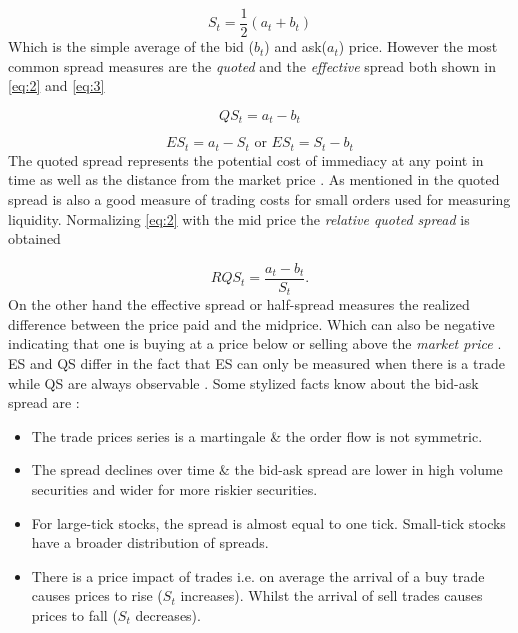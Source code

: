 \documentclass{kththesis}
\theoremstyle{definition}
\begin{document}
\begin{equation}
    \label{eq:1}
    S_{t} = \frac{1}{2}(a_t + b_t)
\end{equation}
Which is the simple average of the bid ($b_t$) and ask($a_t$) price.
However the most common spread measures are the \textit{quoted} and the \textit{effective} \parencite{cartea2015algorithmic, foucault2013market} spread both shown in \autoref{eq:2} and \autoref{eq:3}

\begin{equation}
    \label{eq:2}
    QS_t = a_t - b_t
\end{equation}

\begin{equation}
    \label{eq:3}
    ES_t = a_t - S_t \text{ or } ES_t = S_t - b_t
\end{equation}
The quoted spread represents the potential cost of immediacy at any point in time as well as the distance from the market price \parencite{cartea2015algorithmic}. As mentioned in \textcite{foucault2013market} the quoted spread is also a good measure of trading costs for small orders used for measuring liquidity. Normalizing \autoref{eq:2} with the mid price the \textit{relative quoted spread} is obtained

\begin{equation*}
    RQS_t = \frac{a_t - b_t}{S_t}.
\end{equation*}
On the other hand the effective spread or half-spread measures the realized difference between the price paid and the midprice. Which can also be negative indicating that one is buying at a price below or selling above the \textit{market price} \parencite{cartea2015algorithmic}. ES and QS differ in the fact that ES can only be measured when there is a trade while QS are always observable \parencite{cartea2015algorithmic}. Some stylized facts know about the bid-ask spread are \parencite{hasbrouck2007empirical, madhavan2002market, bouchaud2018trades}:
\begin{itemize}
    \item The trade prices series is a martingale \& the order flow is not symmetric.
    \item The spread declines over time \& the bid-ask spread are lower in high volume securities and wider for more riskier securities.
    \item For large-tick stocks, the spread is almost equal to one tick. Small-tick stocks have a broader distribution of spreads.
    \item There is a price impact of trades i.e. on average the arrival of a buy trade causes prices to rise ($S_t$ increases). Whilst the arrival of sell trades causes prices to fall ($S_t$ decreases).
\end{itemize}
\newpage
\end{document}

